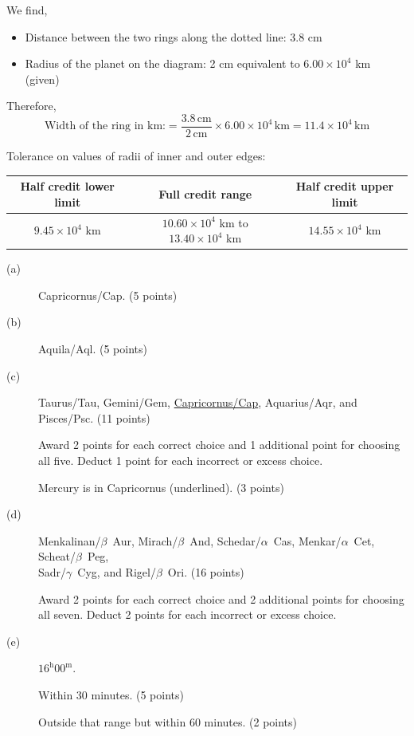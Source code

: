 \begin{description}
We find,
\begin{itemize}
\item Distance between the two rings along the dotted line: 3.8 cm
\item Radius of the planet on the diagram: 2 cm equivalent to $6.00\times10^4$ km (given)
\end{itemize}
Therefore,
\[
\text{Width of the ring in km:}
= \frac{3.8\,\mathrm{cm}}{2\,\mathrm{cm}}\times 6.00\times10^4\,\mathrm{km}
= 11.4\times10^4\,\mathrm{km}
\]

Tolerance on values of radii of inner and outer edges:
\begin{center}
\begin{tabular}{|c|c|c|}
\hline
Half credit lower limit & Full credit range & Half credit upper limit\\
\hline
$9.45\times10^4$ km & $10.60\times10^4$ km to $13.40\times10^4$ km & $14.55\times10^4$ km\\
\hline
\end{tabular}
\end{center}
\end{description}

\begin{description}
\item[(a)] Capricornus/Cap. \hfill(5 points)

\item[(b)] Aquila/Aql. \hfill(5 points)

\item[(c)] Taurus/Tau, Gemini/Gem, \underline{Capricornus/Cap}, Aquarius/Aqr,
  and Pisces/Psc. \hfill(11 points)

  Award 2 points for each correct choice and 1 additional point for choosing
  all five. Deduct 1 point for each incorrect or excess choice.

  Mercury is in Capricornus (underlined). \hfill(3 points)

\item[(d)] Menkalinan/$\beta$~Aur, Mirach/$\beta$~And, Schedar/$\alpha$~Cas,
  Menkar/$\alpha$~Cet, Scheat/$\beta$~Peg,\\
  Sadr/$\gamma$~Cyg, and Rigel/$\beta$~Ori. \hfill(16 points)

  Award 2 points for each correct choice and 2 additional points for choosing
  all seven. Deduct 2 points for each incorrect or excess choice.

\item[(e)] $16^{\mathrm{h}}00^{\mathrm{m}}$.

  Within 30 minutes. \hfill(5 points)

  Outside that range but within 60 minutes. \hfill(2 points)
\end{description}

